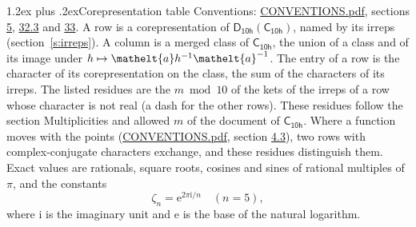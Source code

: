 \documentclass[10pt,a4paper]{article}
\makeatletter
\renewcommand\section{\@startsection{section}{1}{\z@}{-3ex plus -1ex minus -.2ex}%
  {1.2ex plus .2ex}{\normalfont\large\sffamily\bfseries\color{parttitle}}}
\numberwithin{equation}{section}
\newcommand{\eltfont}[1]{{\let\sigma\eltsigma\mathelt{#1}}}
\newcommand{\grp}[1]{\mathsf{#1}}
\newcommand{\elt}[1]{\eltfont{#1}}
\newcommand{\iunit}{\mathrm{i}}
\newcommand{\expe}{\mathrm{e}}
\newcommand{\rootunity}[1]{\zeta_{#1}}
\makeatother
\begin{document}
\section{Corepresentation table}\label{s:character_table}
Conventions: \href{../../CONVENTIONS.pdf}{CONVENTIONS.pdf}, sections \href{../../../rotation/CONVENTIONS.pdf\#conv.5}{5}, \href{../../CONVENTIONS.pdf\#conv.32.3}{32.3} and \href{../../CONVENTIONS.pdf\#conv.33}{33}.
A row is a corepresentation of $\grp{D_{10h}}(\grp{C_{10h}})$, named by its irreps (section~\ref{s:irreps}). A column is a merged class of $\grp{C_{10h}}$, the union of a class and of its image under $h \mapsto \elt{a} h^{-1} \elt{a}^{-1}$. The entry of a row is the character of its corepresentation on the class, the sum of the characters of its irreps.
\leavevmode\label{n:head.parity}The listed residues are the $m \bmod 10$ of the kets of the irreps of a row whose character is not real (a dash for the other rows). These residues follow the section Multiplicities and allowed $m$ of the document of \href{../../../rotation/data/pdf/C10h.pdf}{$\grp{C_{10h}}$}. Where a function moves with the points (\href{../../CONVENTIONS.pdf}{CONVENTIONS.pdf}, section \href{../../../rotation/CONVENTIONS.pdf\#conv.4.3}{4.3}), two rows with complex-conjugate characters exchange, and these residues distinguish them.
\leavevmode\label{n:constant.root}\label{n:index.root.order}Exact values are rationals, square roots, cosines and sines of rational multiples of $\pi$, and the constants
\begin{equation}\label{e:constants}\rootunity{n} = \expe^{2\pi\iunit/n}\quad(n = 5),\end{equation}
where $\iunit$ is the imaginary unit and $\expe$ is the base of the natural logarithm.
\end{document}
